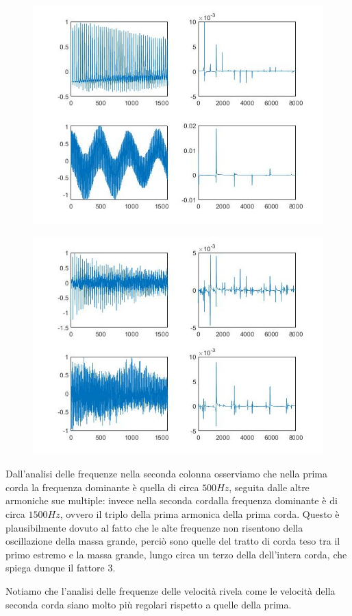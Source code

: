 \documentclass{article}
\begin{document}
\begin{figure}[!h]
\centering
\includegraphics[width=13cm]{figura_vib_pos.jpg}
\end{figure}
 \medskip
\begin{figure}[!h]
\centering
\includegraphics[width=13cm]{figura_vib_vel.jpg}
\end{figure}

\noindent
Dall'analisi delle frequenze nella seconda colonna osserviamo che nella prima corda la frequenza dominante è quella di circa $500Hz$, seguita dalle altre armoniche sue multiple: invece nella seconda cordalla frequenza dominante è di circa $1500Hz$, ovvero il triplo della prima armonica della prima corda. Questo è plausibilmente dovuto al fatto che le alte frequenze non risentono della oscillazione della massa grande, perciò sono quelle del tratto di corda teso tra il primo estremo e la massa grande, lungo circa un terzo della dell'intera corda, che spiega dunque il fattore 3.

Notiamo che l'analisi delle frequenze delle velocità rivela come le velocità della seconda corda siano molto più regolari rispetto a quelle della prima.
\end{document}
